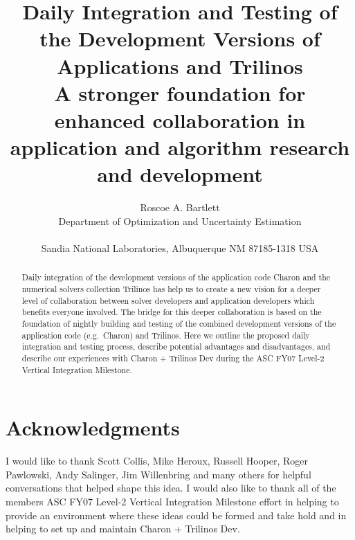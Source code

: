 \documentclass[pdf,ps2pdf,11pt]{SANDreport}
\title{\center
Daily Integration and Testing of the Development Versions of Applications and
Trilinos\\[2ex] {\Large A stronger foundation for enhanced collaboration in
application and algorithm research and development}}
\author{
Roscoe A. Bartlett \\ Department of Optimization and Uncertainty Estimation \\ \\
Sandia National Laboratories, Albuquerque NM 87185-1318 USA \\ }
\begin{document}
\maketitle

%


%
\begin{abstract}
%

Daily integration of the development versions of the application code Charon
and the numerical solvers collection Trilinos has help us to create a new
vision for a deeper level of collaboration between solver developers and
application developers which benefits everyone involved.  The bridge for this
deeper collaboration is based on the foundation of nightly building and
testing of the combined development versions of the application code (e.g.\
Charon) and Trilinos.  Here we outline the proposed daily integration and
testing process, describe potential advantages and disadvantages, and describe
our experiences with Charon + Trilinos Dev during the ASC FY07 Level-2
Vertical Integration Milestone.

%
\end{abstract}
%

%
\clearpage
\section*{Acknowledgments}

I would like to thank Scott Collis, Mike Heroux, Russell Hooper, Roger
Pawlowski, Andy Salinger, Jim Willenbring and many others for helpful
conversations that helped shape this idea.  I would also like to thank all of
the members ASC FY07 Level-2 Vertical Integration Milestone effort in helping
to provide an environment where these ideas could be formed and take hold and
in helping to set up and maintain Charon + Trilinos Dev.

%
\end{document}
